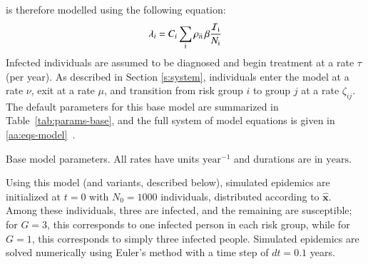 is therefore modelled using the following equation:
\begin{equation}
  \lambda_{i} =
  C_{\mathit{i}}
  \sum_{\mathrm{i}}
  \rho_{\mathit{i}\mathrm{i}} \thinspace
  \beta \frac{\mathcal{I}_{\mathrm{i}}}{N_{\mathrm{i}}}
  \label{eq:foi}
\end{equation}
Infected individuals are assumed to be diagnosed and begin treatment at a rate $\tau$ (per year).
As described in Section \ref{s:system},
individuals enter the model at a rate $\nu$,
exit at a rate $\mu$,
and transition from risk group $i$ to group $j$ at a rate $\zeta_{ij}$.
The default parameters for this base model are summarized in Table~\ref{tab:params-base},
and the full system of model equations is given in \ref{aa:eqs-model}~.
\begin{table}
  \centering
  \caption{Base model parameters.
    All rates have units $\mathrm{year}^{-1}$ and durations are in $\mathrm{years}$.}
  \label{tab:params-base}
  
\end{table}
\par
Using this model (and variants, described below),
simulated epidemics are initialized at $t = 0$ with $N_0 = 1000$ individuals,
distributed according to $\bm{\hat{x}}$.
Among these individuals, three are infected, and the remaining are susceptible;
for $G = 3$, this corresponds to one infected person in each risk group,
while for $G = 1$, this corresponds to simply three infected people.
Simulated epidemics are solved numerically using Euler's method
with a time step of $dt = 0.1$ years.
\par
%
